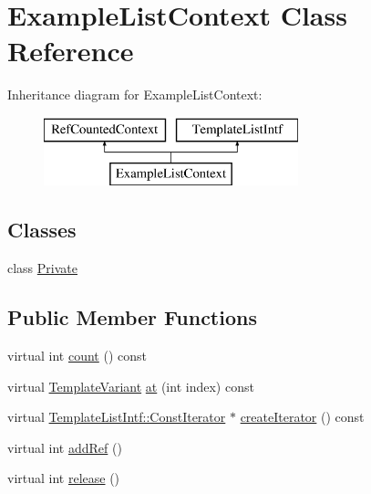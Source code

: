 \hypertarget{class_example_list_context}{}\section{Example\+List\+Context Class Reference}
\label{class_example_list_context}
Inheritance diagram for Example\+List\+Context\+:\begin{figure}[H]
\begin{center}
\leavevmode
\includegraphics[height=2.000000cm]{class_example_list_context}
\end{center}
\end{figure}
\subsection*{Classes}
\begin{DoxyCompactItemize}
\item 
class \mbox{\hyperlink{class_example_list_context_1_1_private}{Private}}
\end{DoxyCompactItemize}
\subsection*{Public Member Functions}
\begin{DoxyCompactItemize}
\item 
virtual int \mbox{\hyperlink{class_example_list_context_a5670e7d7749f6a70c5c13b42ba9131ef}{count}} () const
\item 
virtual \mbox{\hyperlink{class_template_variant}{Template\+Variant}} \mbox{\hyperlink{class_example_list_context_ac661f44438dbb4b2b36ad219c9da6feb}{at}} (int index) const
\item 
virtual \mbox{\hyperlink{class_template_list_intf_1_1_const_iterator}{Template\+List\+Intf\+::\+Const\+Iterator}} $\ast$ \mbox{\hyperlink{class_example_list_context_a21d501486ce90f29c49aeaf48fa53676}{create\+Iterator}} () const
\item 
virtual int \mbox{\hyperlink{class_example_list_context_a94636ca4704e815f35339998fba5940b}{add\+Ref}} ()
\item 
virtual int \mbox{\hyperlink{class_example_list_context_a16f04119a9b9f8d728637e149791d708}{release}} ()
\end{DoxyCompactItemize}
